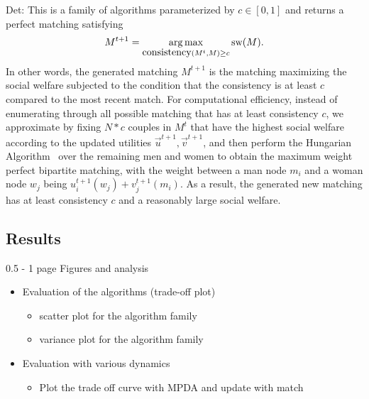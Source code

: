 Det: This is a family of algorithms parameterized by $c \in [0, 1]$ and returns a perfect matching satisfying $$M^{t+1} = \operatorname*{arg\,max}_{\mbox{consistency}(M^t, M) \ge c}{\mbox{sw}(M)}.$$ In other words, the generated matching $M^{t+1}$ is the matching maximizing the social welfare subjected to the condition that the consistency is at least $c$ compared to the most recent match. For computational efficiency, instead of enumerating through all possible matching that has at least consistency $c$, we approximate by fixing $N * c$ couples in $M^t$ that have the highest social welfare according to the updated utilities $\overrightarrow{u}^{t+1}, \overrightarrow{v}^{t+1}$, and then perform the Hungarian Algorithm~\cite{Kuhn55thehungarian,Kuhn56thehungarian,Munkres1957Assignment} over the remaining men and women to obtain the maximum weight perfect bipartite matching, with the weight between a man node $m_i$ and a woman node $w_j$ being $u_i^{t+1}(w_j) + v_j^{t+1}(m_i)$. As a result, the generated new matching has at least consistency $c$ and a reasonably large social welfare.



\subsection{Results}
0.5 - 1 page
Figures and analysis
\begin{itemize}
    \item Evaluation of the algorithms (trade-off plot)
    \begin{itemize}
        \item scatter plot for the algorithm family
        \item variance plot for the algorithm family
    \end{itemize}
    \item Evaluation with various dynamics
    \begin{itemize}
        \item Plot the trade off curve with MPDA and update with match
    \end{itemize}
\end{itemize}


